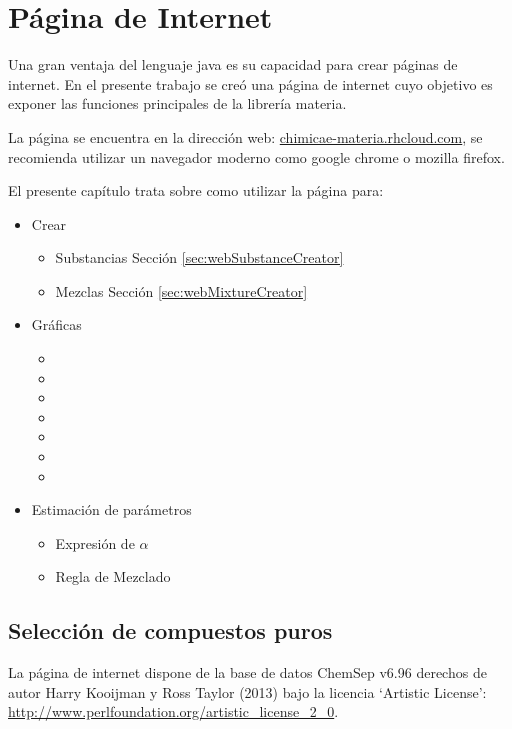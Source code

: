 \chapter{Página de Internet}\label{chap:webPage}

	Una gran ventaja del lenguaje java es su capacidad para crear páginas de internet. En el presente trabajo se creó una página de internet cuyo objetivo es exponer las funciones principales de la librería materia.

	La página se encuentra en la dirección web: \url{chimicae-materia.rhcloud.com}, se recomienda utilizar un navegador moderno como google chrome o mozilla firefox.

	El presente capítulo trata sobre como utilizar la página para:

	\begin{itemize}
		\item{Crear}
			\begin{itemize}
				\item{Substancias} Sección \ref{sec:webSubstanceCreator}
				\item{Mezclas} Sección \ref{sec:webMixtureCreator}
			\end{itemize}
		\item{Gráficas}
			\begin{itemize}
				\item {}
				\item {}
				\item {}
				\item {}
				\item {}
				\item {}
				\item {}
			\end{itemize}
		\item{Estimación de parámetros}
			\begin{itemize}
				\item Expresión de $\alpha$
				\item Regla de Mezclado
			\end{itemize}
	\end{itemize}

\section{Selección de compuestos puros}\label{sec:webCompounds}

	La página de internet dispone de la base de datos ChemSep v6.96 derechos de autor  Harry Kooijman y Ross Taylor (2013) bajo la licencia `Artistic License': \url{ http://www.perlfoundation.org/artistic_license_2_0}.

